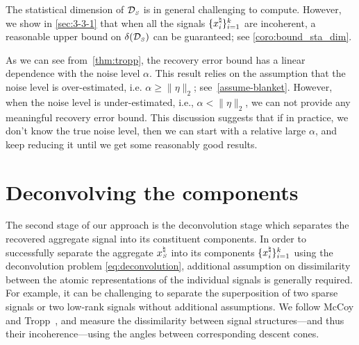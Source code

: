 The statistical dimension of $\mathcal{D}_{\scriptscriptstyle S}$ is in general challenging to compute. However, we show in \autoref{sec:3-3-1} that when all the signals $\{x_i^{\natural}\}_{i=1}^k$ are incoherent, a reasonable upper bound on $\delta(\mathcal{D}_{\scriptscriptstyle S})$ can be guaranteed; see \autoref{coro:bound_sta_dim}.

As we can see from~\autoref{thm:tropp}, the recovery error bound has a linear dependence with the noise level $\alpha$. This result relies on the assumption that the noise level is over-estimated, i.e. $\alpha \geq \|\eta\|_2$; see~\autoref{assume-blanket}. However, when the noise level is under-estimated, i.e., $\alpha < \|\eta\|_2$, we can not provide any meaningful recovery error bound. This discussion suggests that if in practice, we don't know the true noise level, then we can start with a relative large $\alpha$, and keep reducing it until we get some reasonably good results.

\section{Deconvolving the components}\label{sec:3-3}

The second stage of our approach is the deconvolution stage which separates the recovered aggregate signal into its constituent components. In order to successfully separate the aggregate $x_{\scriptscriptstyle S}^{\natural}$ into its components $\{x_i^{\natural}\}_{i=1}^k$ using the deconvolution problem \eqref{eq:deconvolution}, additional assumption on dissimilarity between the atomic representations of the individual signals is generally required. For example, it can be challenging to separate the superposition of two sparse signals or two low-rank signals without additional assumptions. We follow McCoy and Tropp~\cite{mccoy2013achievable}, and measure the dissimilarity between signal structures---and thus their incoherence---using the angles between corresponding descent cones.

